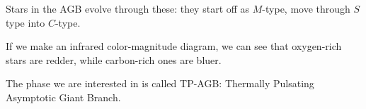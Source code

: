 \documentclass[main.tex]{subfiles}
\begin{document}
Stars in the AGB evolve through these: they start off as \(M\)-type, move through \(S\) type into \(C\)-type.

If we make an infrared color-magnitude diagram, we can see that oxygen-rich stars are redder, while carbon-rich ones are bluer.

The phase we are interested in is called TP-AGB: Thermally Pulsating Asymptotic Giant Branch.
\end{document}
